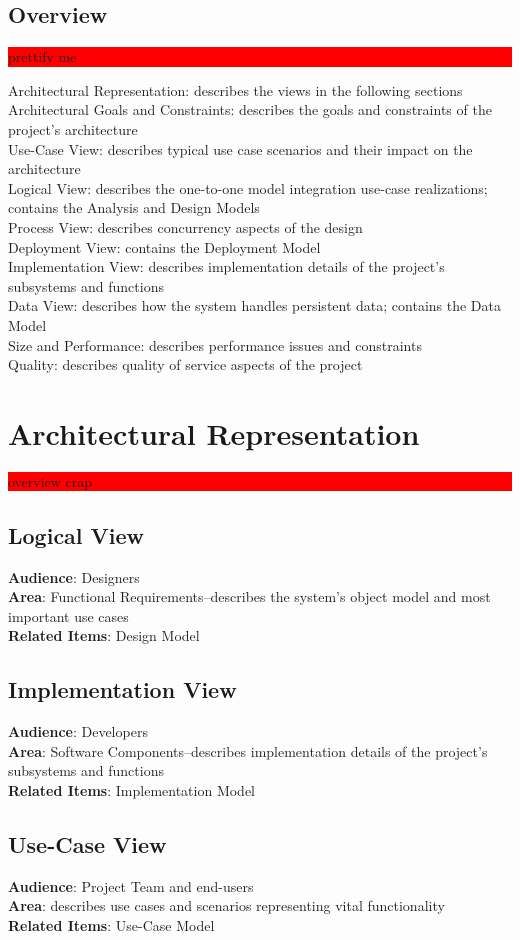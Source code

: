 \documentclass{article}
\newcommand{\todo}[1]{\colorbox{red}{\begin{minipage}{\textwidth}{#1}\end{minipage}}}
\begin{document}
\subsection{Overview}
\todo{prettify me}
Architectural Representation: describes the views in the following sections\\
Architectural Goals and Constraints: describes the goals and constraints of the project's architecture\\
Use-Case View: describes typical use case scenarios and their impact on the architecture\\
Logical View: describes the one-to-one model integration use-case realizations; contains the Analysis and Design Models\\
Process View: describes concurrency aspects of the design\\
Deployment View: contains the Deployment Model\\
Implementation View: describes implementation details of the project's subsystems and functions\\
Data View: describes how the system handles persistent data; contains the Data Model\\
Size and Performance: describes performance issues and constraints\\
Quality: describes quality of service aspects of the project

\section{Architectural Representation}
\todo{overview crap}
\subsection{Logical View}
\textbf{Audience}: Designers\\
\textbf{Area}: Functional Requirements--describes the system's object model and most important use cases\\
\textbf{Related Items}: Design Model
\subsection{Implementation View}
\textbf{Audience}: Developers\\
\textbf{Area}: Software Components--describes implementation details of the project's subsystems and functions\\
\textbf{Related Items}: Implementation Model
\subsection{Use-Case View}
\textbf{Audience}: Project Team and end-users\\
\textbf{Area}: describes use cases and scenarios representing vital functionality\\
\textbf{Related Items}: Use-Case Model
\end{document}
